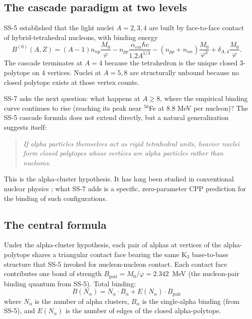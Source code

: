 \documentclass[11pt,letterpaper]{article}
\newcommand{\phig}{\varphi}
\newcommand{\Mzero}{M_0}
\newcommand{\Bpair}{B_{\mathrm{pair}}}
\newcommand{\Balpha}{B_{\alpha}}
\newcommand{\Nalpha}{N_{\alpha}}
\begin{document}
\subsection{The cascade paradigm at two levels}

SS-5 established that the light nuclei $A = 2, 3, 4$ are built by face-to-face contact of hybrid-tetrahedral nucleons, with binding energy
\begin{equation}
B^{(0)}(A, Z) = (A-1) n_{np} \frac{\Mzero}{\phig} - n_{pp} \frac{\alpha_{em}\hbar c}{1.2 A^{1/3}} - (n_{pp} + n_{nn})\frac{\Mzero}{\phig^3} + \delta_{A,4}\frac{\Mzero}{\phig}.
\label{eq:SS5}
\end{equation}
The cascade terminates at $A = 4$ because the tetrahedron is the unique closed 3-polytope on 4 vertices. Nuclei at $A = 5, 8$ are structurally unbound because no closed polytope exists at those vertex counts.

SS-7 asks the next question: what happens at $A \geq 8$, where the empirical binding curve continues to rise (reaching its peak near ${}^{56}$Fe at 8.8 MeV per nucleon)? The SS-5 cascade formula does not extend directly, but a natural generalization suggests itself:

\begin{quote}
\emph{If alpha particles themselves act as rigid tetrahedral units, heavier nuclei form closed polytopes whose vertices are alpha particles rather than nucleons.}
\end{quote}

This is the alpha-cluster hypothesis. It has long been studied in conventional nuclear physics \cite{freer_alpha, horiuchi_alpha}; what SS-7 adds is a specific, zero-parameter CPP prediction for the binding of such configurations.

\subsection{The central formula}

Under the alpha-cluster hypothesis, each pair of alphas at vertices of the alpha-polytope shares a triangular contact face bearing the same K$_3$ base-to-base structure that SS-5 invoked for nucleon-nucleon contact. Each contact face contributes one bond of strength $\Bpair = \Mzero/\phig = 2.342$~MeV (the nucleon-pair binding quantum from SS-5). Total binding:
\begin{equation}
\boxed{B(\Nalpha) = \Nalpha \cdot \Balpha + E(\Nalpha) \cdot \Bpair}
\label{eq:SS7}
\end{equation}
where $\Nalpha$ is the number of alpha clusters, $\Balpha$ is the single-alpha binding (from SS-5), and $E(\Nalpha)$ is the number of edges of the closed alpha-polytope.
\end{document}
